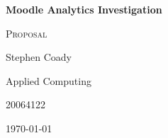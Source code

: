 \begin{titlepage}
	{\huge\bfseries Moodle Analytics Investigation\par}
	\vspace{1cm}
	{\scshape\large Proposal \par}
	\vspace{6cm}
	{\Large Stephen Coady\par}
	{\Large Applied Computing\par}
	{\Large 20064122\par}
\vspace{2cm}

{\large \today\par}

	\vfill
	
\end{titlepage}
